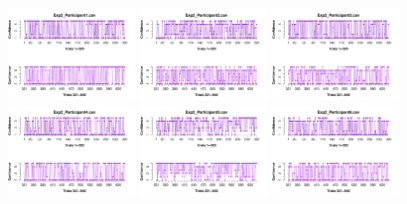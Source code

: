 \begin{itemize}
\begin{figure}[th]
\centering
\includegraphics[width=0.30\textwidth]{Figures/Rating_Exp2_P1} \includegraphics[width=0.30\textwidth]{Figures/Rating_Exp2_P2} \includegraphics[width=0.30\textwidth]{Figures/Rating_Exp2_P3}
\includegraphics[width=0.30\textwidth]{Figures/Rating_Exp2_P4} \includegraphics[width=0.30\textwidth]{Figures/Rating_Exp2_P5} \includegraphics[width=0.30\textwidth]{Figures/Rating_Exp2_P6}

\end{figure}
\end{itemize}
